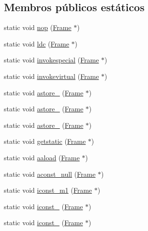 \subsection*{Membros públicos estáticos}
\begin{DoxyCompactItemize}
\item 
static void \hyperlink{class_instruction_impl_a167bb8f230879fe6470318755fa3bcc9}{nop} (\hyperlink{struct_frame}{Frame} $\ast$)
\item 
static void \hyperlink{class_instruction_impl_ade3ec2b9168ba2026599db6136e60d91}{ldc} (\hyperlink{struct_frame}{Frame} $\ast$)
\item 
static void \hyperlink{class_instruction_impl_ae794ec480c5cd8809d1215aa9442501b}{invokespecial} (\hyperlink{struct_frame}{Frame} $\ast$)
\item 
static void \hyperlink{class_instruction_impl_a3d197a31eaa6bc79b6d882b0ac9f1a67}{invokevirtual} (\hyperlink{struct_frame}{Frame} $\ast$)
\item 
static void \hyperlink{class_instruction_impl_a8e22c97b7a5408889fc672f53975739b}{astore\+\_} (\hyperlink{struct_frame}{Frame} $\ast$)
\item 
static void \hyperlink{class_instruction_impl_af75825b606faebaa31f5629712eabc8d}{astore\+\_} (\hyperlink{struct_frame}{Frame} $\ast$)
\item 
static void \hyperlink{class_instruction_impl_ab479b5925d755dd943dd86d054070dff}{astore\+\_} (\hyperlink{struct_frame}{Frame} $\ast$)
\item 
static void \hyperlink{class_instruction_impl_af10750df1ad4bf72ac80445dbbec068b}{getstatic} (\hyperlink{struct_frame}{Frame} $\ast$)
\item 
static void \hyperlink{class_instruction_impl_a3f4845ec999e7748deb58df324a71deb}{aaload} (\hyperlink{struct_frame}{Frame} $\ast$)
\item 
static void \hyperlink{class_instruction_impl_a9f1d9c6c5641f592c37652c38e47751d}{aconst\+\_\+null} (\hyperlink{struct_frame}{Frame} $\ast$)
\item 
static void \hyperlink{class_instruction_impl_ab36fd8503491518fcb80b92f7ee4003c}{iconst\+\_\+m1} (\hyperlink{struct_frame}{Frame} $\ast$)
\item 
static void \hyperlink{class_instruction_impl_a51eaef20621f31549bd84147ad484e10}{iconst\+\_} (\hyperlink{struct_frame}{Frame} $\ast$)
\item 
static void \hyperlink{class_instruction_impl_a78866e94cc43dba54dde53608cb18053}{iconst\+\_} (\hyperlink{struct_frame}{Frame} $\ast$)

\end{DoxyCompactItemize}
